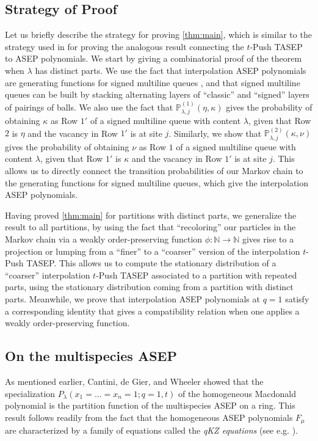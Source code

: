 \documentclass[12pt]{amsart}
\theoremstyle{definition}
\newcommand{\NN}{\mathbb N}
\newcommand{\PPone}[1]{\mathbb P^{(1)}_{#1}}
\newcommand{\PPtwo}[1]{\mathbb P^{(2)}_{#1}}
\def\LW#1{(\textcolor{teal}{LW:#1})}
\def\HBD#1{(\textcolor{violet}{HBD:#1})}
\begin{document}
\subsection{Strategy of Proof}
Let us briefly describe the strategy for proving \cref{thm:main}, which is similar to the strategy used in 
\cite{AyyerMartinWilliams2025} for proving the analogous result connecting the $t$-Push TASEP to ASEP polynomials.
We start by giving a combinatorial proof of the theorem
when $\lambda$ has distinct parts.  We use the fact that 
interpolation ASEP polynomials are generating functions for 
signed multiline queues \cite{BenDaliWilliams2025}, 
and that signed multiline queues can be built by stacking alternating layers of ``classic'' and ``signed'' layers of pairings of balls.  We also use the fact that
$\PPone{\lambda,j}(\eta, \kappa)$ gives the probability of obtaining
$\kappa$ as Row $1'$ of a signed multiline queue with content $\lambda$, given that Row $2$ is $\eta$ and the vacancy in Row $1'$ is at site $j$.  Similarly, we show that 
$\PPtwo{\lambda,j}(\kappa, \nu)$ gives the probability of obtaining $\nu$ as Row $1$ of a signed multiline queue with content $\lambda$, given that Row $1'$ is $\kappa$ and the vacancy in Row $1'$ is at site $j$.  This allows us to directly connect the transition probabilities of our Markov chain to the generating functions for signed multiline queues, which give the interpolation ASEP polynomials.

Having proved \cref{thm:main} for partitions with distinct parts, we generalize the result to all partitions, by 
using the fact that ``recoloring'' our particles in the Markov chain via a weakly order-preserving function $\phi:\NN \to \NN$ gives rise to a projection or lumping from a ``finer'' to a ``coarser'' version of the interpolation $t$-Push TASEP.  This allows us to compute the stationary distribution of a ``coarser'' interpolation $t$-Push TASEP associated to a partition with repeated parts, using the stationary distribution coming from a partition with distinct parts.  Meanwhile, we prove that interpolation ASEP polynomials at $q=1$ satisfy a corresponding identity that gives a compatibility relation when one applies a weakly order-preserving function.



\bigskip
\subsection{On the multispecies ASEP}
As mentioned earlier,   Cantini, de Gier, and Wheeler \cite{CantinideGierWheeler2015} showed that
the specialization $P_{\lambda}(x_1=\dots=x_n=1;q=1,t)$ of the homogeneous Macdonald polynomial 
 is the partition function of the multispecies ASEP on a ring. This result follows readily from the fact that the homogeneous ASEP polynomials $F_\mu$ are characterized by a family of equations called the \emph{qKZ equations} (see e.g. \cite[Equations (17) to (19)]{CantinideGierWheeler2015}). 
\end{document}
